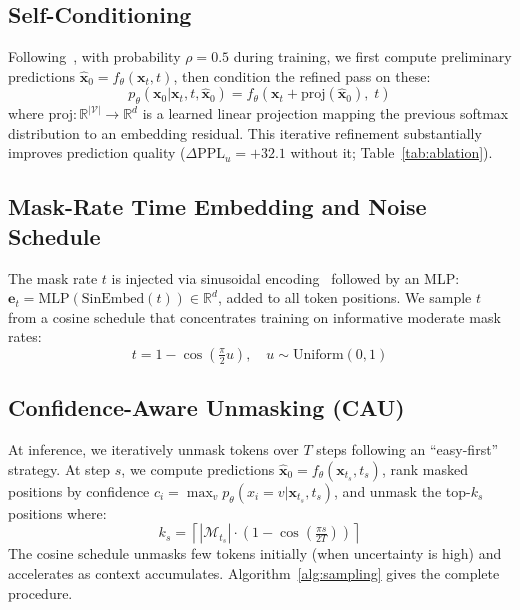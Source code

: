 \documentclass{article}
\newcommand{\R}{\mathbb{R}}
\newcommand{\V}{\mathcal{V}}
\begin{document}
\subsection{Self-Conditioning}
\label{sec:method:selfcond}

Following~\citet{chen2023analog}, with probability $\rho = 0.5$ during training, we first compute preliminary predictions $\hat{\mathbf{x}}_0 = f_\theta(\mathbf{x}_t, t)$, then condition the refined pass on these:
\begin{equation}
    p_\theta(\mathbf{x}_0 | \mathbf{x}_t, t, \hat{\mathbf{x}}_0) = f_\theta\!\left(\mathbf{x}_t + \text{proj}(\hat{\mathbf{x}}_0),\; t\right)
    \label{eq:selfcond}
\end{equation}
where $\text{proj}: \R^{|\V|} \to \R^d$ is a learned linear projection mapping the previous softmax distribution to an embedding residual.
This iterative refinement substantially improves prediction quality ($\Delta\text{PPL}_u = +32.1$ without it; Table~\ref{tab:ablation}).

\subsection{Mask-Rate Time Embedding and Noise Schedule}
\label{sec:method:time}

The mask rate $t$ is injected via sinusoidal encoding~\citep{vaswani2017attention} followed by an MLP: $\mathbf{e}_t = \text{MLP}(\text{SinEmbed}(t)) \in \R^d$, added to all token positions.
We sample $t$ from a cosine schedule that concentrates training on informative moderate mask rates:
\begin{equation}
    t = 1 - \cos\!\left(\tfrac{\pi}{2} u\right), \quad u \sim \text{Uniform}(0, 1)
    \label{eq:schedule}
\end{equation}

\subsection{Confidence-Aware Unmasking (CAU)}
\label{sec:method:sampling}

At inference, we iteratively unmask tokens over $T$ steps following an ``easy-first'' strategy.
At step $s$, we compute predictions $\hat{\mathbf{x}}_0 = f_\theta(\mathbf{x}_{t_s}, t_s)$, rank masked positions by confidence $c_i = \max_v p_\theta(x_i{=}v | \mathbf{x}_{t_s}, t_s)$, and unmask the top-$k_s$ positions where:
\begin{equation}
    k_s = \left\lceil |\mathcal{M}_{t_s}| \cdot \left(1 - \cos\!\left(\tfrac{\pi s}{2T}\right)\right) \right\rceil
    \label{eq:cau}
\end{equation}
The cosine schedule unmasks few tokens initially (when uncertainty is high) and accelerates as context accumulates.
Algorithm~\ref{alg:sampling} gives the complete procedure.
\end{document}
